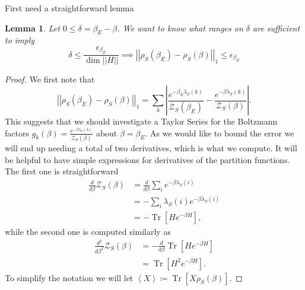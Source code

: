 \documentclass{article}
\newtheorem{lemma}[theorem]{Lemma}
\newcommand{\brackets}[1]{\left[ #1 \right]}
\newcommand{\abs}[1]{\left| #1 \right|}
\newcommand{\norm}[1]{\left| \left| #1 \right| \right|}
\newcommand{\anglebrackets}[1]{\left< #1 \right>}
\DeclareMathOperator{\Tr}{Tr}
\newcommand{\trace}[1]{\Tr \brackets{ #1 }}
\newcommand{\partfun}{\mathcal{Z}}
\begin{document}
First need a straightforward lemma
\begin{lemma} \label{lem:thermal_state_diff_bound}
    Let $0 \leq \delta = \beta_E - \beta$. We want to know what ranges on $\delta$ are sufficient to imply
    \begin{equation}
        \delta \leq \frac{\epsilon_{\beta_E}}{\dim \norm{H}} \implies \norm{\rho_S(\beta_E) - \rho_S(\beta)}_1 \leq \epsilon_{\beta_E}
    \end{equation}
\end{lemma}
\begin{proof}
    We first note that
    \begin{equation}
        \norm{\rho_S(\beta_E) - \rho_S(\beta)}_1 = \sum_k \abs{\frac{e^{-\beta_E \lambda_S(k)}}{\partfun_S(\beta_E)} - \frac{e^{-\beta \lambda_S(k)}}{\partfun_S(\beta)}}. \label{eq:thermal_diffs_1}
    \end{equation}
    This suggests that we should investigate a Taylor Series for the Boltzmann factors $g_k(\beta) = \frac{e^{-\beta \lambda_S(k)}}{\partfun_S(\beta)}$ about $\beta = \beta_E$. As we would like to bound the error we will end up needing a total of two derivatives, which is what we compute. It will be helpful to have simple expressions for derivatives of the partition functions. The first one is straightforward
    \begin{align}
        \frac{d}{d\beta} \partfun_S(\beta) &= \frac{d}{d\beta} \sum_i e^{-\beta \lambda_S(i)} \\
        &= - \sum_i \lambda_S(i) e^{-\beta \lambda_S(i)} \\
        &= - \trace{H e^{-\beta H}},
    \end{align}
    while the second one is computed similarly as
    \begin{align}
        \frac{d^2}{d\beta^2} \partfun_S(\beta) &= - \frac{d}{d\beta} \trace{H e^{-\beta H}} \\
        &= \trace{H^2 e^{-\beta H}}.
    \end{align}
    To simplify the notation we will let $\anglebrackets{X} \coloneqq \trace{X \rho_S(\beta)}$.


\end{proof}
\end{document}
